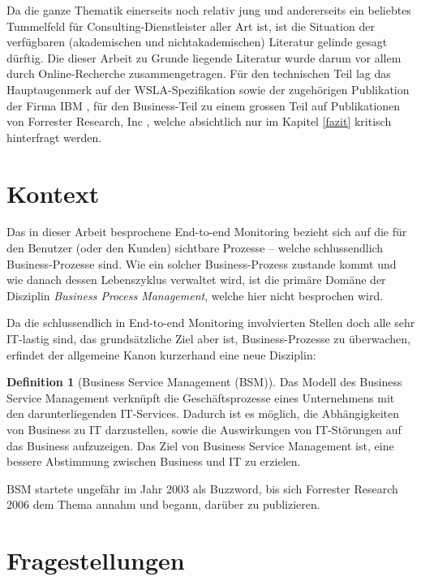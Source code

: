 \documentclass[11pt,listof=totoc]{scrreprt} %
\theoremstyle{definition}
\newtheorem{definition}{Definition}
\begin{document}
Da die ganze Thematik einerseits noch relativ jung und andererseits ein beliebtes Tummelfeld für Consulting-Dienstleister aller Art ist, ist die Situation der verfügbaren (akademischen und nichtakademischen) Literatur gelinde gesagt dürftig. Die dieser Arbeit zu Grunde liegende Literatur wurde darum vor allem durch Online-Recherche zusammengetragen. Für den technischen Teil lag das Hauptaugenmerk auf der WSLA-Spezifikation sowie der zugehörigen Publikation der Firma IBM \cite{ibm:wslaSpec, ibm:wslaPaper}, für den Business-Teil zu einem grossen Teil auf Publikationen von Forrester Research, Inc \cite{forrester:bsm, forrester:implementingBsm, forrester:slaBestPractices, stephenmann}, welche absichtlich nur im Kapitel \ref{fazit} kritisch hinterfragt werden.

\section{Kontext}

Das in dieser Arbeit besprochene End-to-end Monitoring bezieht sich auf die für den Benutzer (oder den Kunden) sichtbare Prozesse -- welche schlussendlich Business-Prozesse sind. Wie ein solcher Business-Prozess zustande kommt und wie danach dessen Lebenszyklus verwaltet wird, ist die primäre Domäne der Disziplin {\em Business Process Management}, welche hier nicht besprochen wird.

Da die schlussendlich in End-to-end Monitoring involvierten Stellen doch alle sehr IT-lastig sind, das grundsätzliche Ziel aber ist, Business-Prozesse zu überwachen, erfindet der allgemeine Kanon kurzerhand eine neue Disziplin:

\begin{definition}[Business Service Management (BSM)]
Das Modell des Business Service Management verknüpft die Geschäftsprozesse eines Unternehmens mit den darunterliegenden IT-Services. Dadurch ist es möglich, die Abhängigkeiten von Business zu IT darzustellen, sowie die Auswirkungen von IT-Störungen auf das Business aufzuzeigen. Das Ziel von Business Service Management ist, eine bessere Abstimmung zwischen Business und IT zu erzielen. \cite{wiki:bsm}
\end{definition}

BSM startete ungefähr im Jahr 2003 als Buzzword, bis sich Forrester Research 2006 dem Thema annahm und begann, darüber zu publizieren. \cite{wiki:bsm, forrester:bsm, forrester:implementingBsm}

\section{Fragestellungen}
\end{document}

